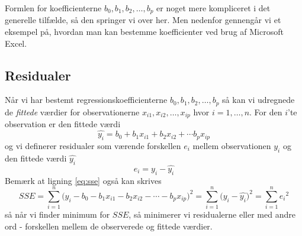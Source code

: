 Formlen for koefficienterne \(b_0,b_1,b_2,\ldots,b_p\) er noget mere kompliceret i det generelle tilfælde, så den springer vi over her. Men nedenfor gennengår vi et eksempel på, hvordan man kan bestemme koefficienter ved brug af Microsoft Excel.

\subsection{Residualer}
Når vi har bestemt regressionskoefficienterne \(b_0,b_1,b_2,\ldots,b_p\) så kan vi udregnede de \textit{fittede} værdier for observationerne \(x_{i1},x_{i2},\ldots,x_{ip}\) hvor \(i=1,\ldots,n\). For den \(i\)'te observation er den fittede værdi
\begin{displaymath}
  \widehat{y_i} = b_0 + b_1 x_{i1} + b_2 x_{i2} + \cdots b_p x_{ip}
\end{displaymath}
og vi definerer residualer som værende forskellen \(e_i\) mellem observationen \(y_i\) og den fittede værdi \(\widehat{y_i}\)
\begin{displaymath}
  e_i = y_i - \widehat{y_i}
\end{displaymath}
Bemærk at ligning \ref{eq:sse} også kan skrives
\begin{displaymath}
  SSE =\sum^n_{i=1} {\big(y_i - b_0 - b_1 x_{i1} - b_2 x_{i2} - \cdots - b_p x_{ip} \big)}^2 = \sum^n_{i=1} {\big(y_i - \widehat{y_i} \big)}^2 =  \sum^n_{i=1} {e_i}^2
\end{displaymath}
så når vi finder minimum for \(SSE\), så minimerer vi residualerne eller med andre ord - forskellen mellem de observerede og fittede værdier.

